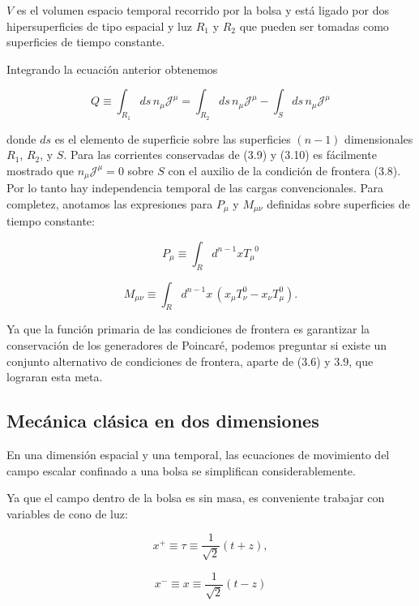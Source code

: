 $V$ es el volumen espacio temporal recorrido por la bolsa y está ligado por dos hipersuperficies de tipo espacial y luz ${R}_{1}$ y ${R}_{2}$ que pueden ser tomadas como superficies de tiempo constante.

Integrando la ecuación anterior obtenemos

\begin{equation}
Q \equiv \int_{{R}_{1}} ds \, {n}_{\mu} \mathscr{J}^{\mu} = \int_{{R}_{2}} ds \, {n}_{\mu} \mathscr{J}^{\mu} - \int_{S} ds \, {n}_{\mu} \mathscr{J}^{\mu}
\end{equation}

donde $ds$ es el elemento de superficie sobre las superficies $(n-1)$ dimensionales ${R}_{1}$, ${R}_{2}$, y $S$. Para las corrientes conservadas de (3.9) y (3.10) es fácilmente mostrado que ${n}_{\mu} \mathscr{J}^{\mu } = 0$ sobre $S$ con el auxilio de la condición de frontera (3.8). Por lo tanto hay independencia temporal de las cargas convencionales. Para completez, anotamos las expresiones para ${P}_{\mu}$ y ${M}_{\mu \nu}$ definidas sobre superficies de tiempo constante:

\begin{equation}
{P}_{\mu} \equiv \int_{R} {d}^{n-1} x {T}_{\mu}^{\phantom{\mu} 0}
\end{equation}

\begin{equation}
{M}_{\mu \nu} \equiv \int_{R} {d}^{n-1} x \, ({x}_{\mu} {T}_{\nu}^{0} - {x}_{\nu} {T}_{\mu}^{0}).
\end{equation}

Ya que la función primaria de las condiciones de frontera es garantizar la conservación de los generadores de Poincaré, podemos preguntar si existe un conjunto alternativo de condiciones de frontera, aparte de (3.6) y 3.9, que lograran esta meta.


\subsection{Mecánica clásica en dos dimensiones}

En una dimensión espacial y una temporal, las ecuaciones de movimiento del campo escalar confinado a una bolsa se simplifican considerablemente.

Ya que el campo dentro de la bolsa es sin masa, es conveniente trabajar con variables de cono de luz:

\[
{x}^{+} \equiv \tau \equiv \frac{1}{\sqrt{2}}(t + z),
\]

\[
{x}^{-} \equiv x \equiv \frac{1}{\sqrt{2}} (t -z)
\]

